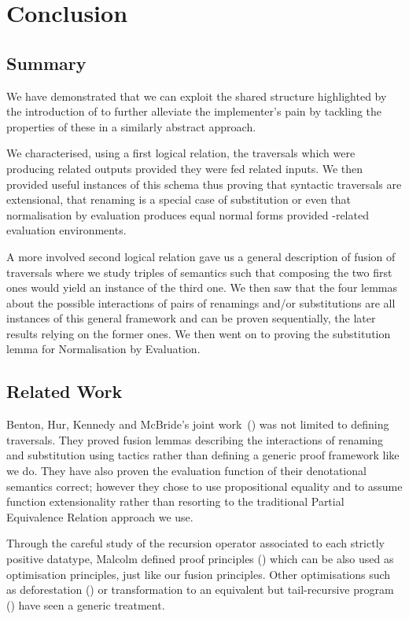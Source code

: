 \chapter{Conclusion}

\section{Summary}

We have demonstrated that we can exploit the shared structure highlighted by the
introduction of  to further alleviate the implementer's pain by
tackling the properties of these  in a similarly abstract approach.

We characterised, using a first logical relation, the traversals which were
producing related outputs provided they were fed related inputs. We then provided
useful instances of this schema thus proving that syntactic traversals are
extensional, that renaming is a special case of substitution or even that
normalisation by evaluation produces equal normal forms provided -related
evaluation environments.

A more involved second logical relation gave us a general description of fusion
of traversals where we study triples of semantics such that composing the two
first ones would yield an instance of the third one. We then saw that the four
lemmas about the possible interactions of pairs of renamings and/or substitutions
are all instances of this general framework and can be proven sequentially, the
later results relying on the former ones. We then went on to proving the
substitution lemma for Normalisation by Evaluation.

\section{Related Work}

Benton, Hur, Kennedy and McBride's joint work~(\citeyear{benton2012strongly}) was not
limited to defining traversals. They proved fusion lemmas describing the interactions
of renaming and substitution using tactics rather than defining a generic proof framework
like we do. They have also proven the evaluation function of their denotational semantics
correct; however they chose to use propositional equality and to assume function
extensionality rather than resorting to the traditional Partial Equivalence Relation
approach we use.

Through the careful study of the recursion operator associated to each strictly positive
datatype, Malcolm defined proof principles (\cite{DBLP:journals/scp/Malcolm90}) which can
be also used as optimisation principles, just like our fusion principles. Other
optimisations such as deforestation (\cite{wadler1990deforestation}) or transformation
to an equivalent but tail-recursive program (\cite{TomeCortinas:2018:AAM:3240719.3241787})
have seen a generic treatment.


